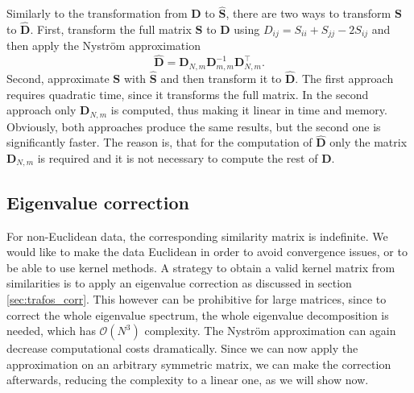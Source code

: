 \documentclass[twoside,11pt]{article}
\begin{document}
Similarly to the transformation from $\mathbf{D}$ to $\mathbf{\hat{S}}$,
there are two ways to transform $\mathbf{S}$ to $\mathbf{\hat{D}}$.
First, transform the full matrix $\mathbf{S}$ to $\mathbf{D}$
using $D_{ij} = S_{ii} + S_{jj} - 2 S_{ij}$
and then apply the Nystr\"om approximation
\begin{equation}
\mathbf{\hat{D}} = \mathbf{D}_{N,m}
\mathbf{D}_{m,m}^{-1}
\mathbf{D}_{N,m}^\top.
\label{eq:dis_corr_app}
\end{equation}
Second, approximate $\mathbf{S}$ with $\mathbf{\hat{S}}$
and then transform it to $\mathbf{\hat{D}}$.
The first approach requires quadratic time,
since it transforms the full matrix.
In the second approach only $\mathbf{D}_{N,m}$ is computed,
thus making it linear in time and memory.
Obviously, both approaches produce the same results,
but the second one is significantly faster.
The reason is, that for the computation of $\mathbf{\hat{D}}$
only the matrix $\mathbf{D}_{N,m}$ is required
and it is not necessary to compute the rest of $\mathbf{D}$.

\subsection{Eigenvalue correction}
For non-Euclidean data,
the corresponding similarity matrix is indefinite.
We would like to make the data Euclidean
in order to avoid convergence issues,
or to be able to use kernel methods.
A strategy to obtain a valid kernel matrix from similarities
is to apply an eigenvalue correction as discussed in section \ref{sec:trafos_corr}. 
This however can be prohibitive for large matrices, since to correct the whole
eigenvalue spectrum, the whole eigenvalue decomposition is needed,
which has $\mathcal{O}(N^3)$ complexity.
The Nystr\"om approximation can again decrease computational costs dramatically.
Since we can now apply the approximation on an arbitrary symmetric matrix,
we can make the correction afterwards,
reducing the complexity to a linear one, as we will show now.
\end{document}
